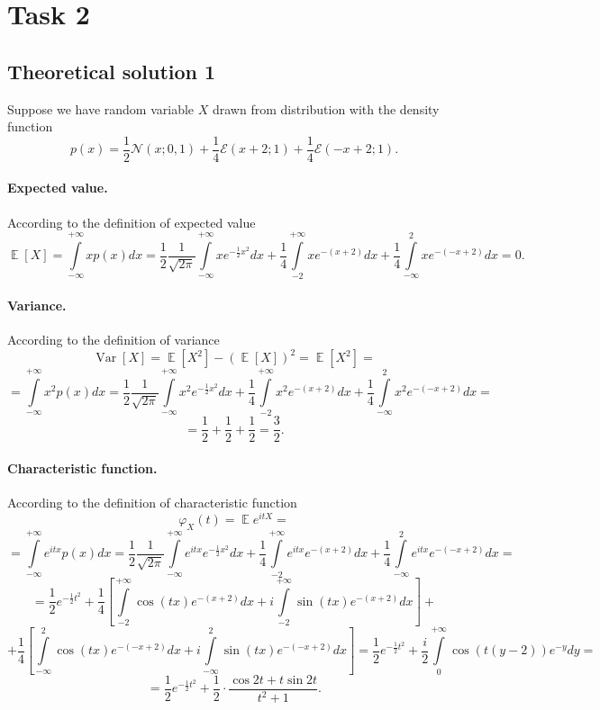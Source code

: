 \documentclass[a4paper, 12pt]{article}
\DeclareMathOperator*{\E}{\mathbb{E}}
\DeclareMathOperator*{\Var}{\text{Var}}
\begin{document}
\section{Task 2}
\subsection{Theoretical solution 1}
Suppose we have random variable $X$ drawn from distribution with the density function 
\begin{equation}
\label{eq2_1}
p(x) = \dfrac{1}{2} \mathcal{N}(x; 0, 1) + \dfrac{1}{4} \mathcal{E}(x+2; 1) + \dfrac{1}{4} \mathcal{E}(-x+2; 1).
\end{equation}
\paragraph{Expected value.} According to the definition of expected value
$$
\E [X] = \int \limits_{- \infty}^{+\infty} x p(x) dx = \dfrac{1}{2} \dfrac{1}{\sqrt{2 \pi}} \int \limits_{-\infty}^{+\infty} xe^{-\frac{1}{2}x^2} dx + \dfrac{1}{4} \int \limits_{-2}^{+\infty} xe^{-(x+2)} dx + \dfrac{1}{4} \int \limits_{-\infty}^{2} xe^{-(-x+2)} dx = 0.
$$
\paragraph{Variance.} According to the definition of variance
$$
\Var [X] = \E [X^2] - (\E [X])^2 = \E[X^2] = 
$$
$$
= \int \limits_{- \infty}^{+\infty} x^2 p(x) dx = \dfrac{1}{2} \dfrac{1}{\sqrt{2 \pi}} \int \limits_{-\infty}^{+\infty} x^2e^{-\frac{1}{2}x^2} dx + \dfrac{1}{4} \int \limits_{-2}^{+\infty} x^2e^{-(x+2)} dx + \dfrac{1}{4} \int \limits_{-\infty}^{2} x^2e^{-(-x+2)} dx =
$$
$$
= \dfrac{1}{2} + \dfrac{1}{2} + \dfrac{1}{2} = \dfrac{3}{2}.
$$
\paragraph{Characteristic function.}
According to the definition of characteristic function
$$
\varphi_X(t) = \E e^{itX} = 
$$
$$
= \int \limits_{- \infty}^{+\infty} e^{itx} p(x) dx = \dfrac{1}{2} \dfrac{1}{\sqrt{2 \pi}} \int \limits_{-\infty}^{+\infty} e^{itx} e^{-\frac{1}{2}x^2} dx + \dfrac{1}{4} \int \limits_{-2}^{+\infty} e^{itx} e^{-(x+2)} dx + \dfrac{1}{4} \int \limits_{-\infty}^{2} e^{itx} e^{-(-x+2)} dx = 
$$
$$
= \dfrac{1}{2} e^{-\frac{1}{2}t^2} + \dfrac{1}{4} \left[ \int \limits_{-2}^{+\infty} \cos(tx) e^{-(x + 2)}dx + i\int \limits_{-2}^{+\infty} \sin(tx) e^{-(x + 2)}dx \right] +
$$
$$
+ \dfrac{1}{4} \left[ \int \limits_{-\infty}^{2} \cos(tx) e^{-(-x+2)}dx + i\int \limits_{-\infty}^{2} \sin(tx) e^{-(-x+2)}dx \right] = 
\dfrac{1}{2} e^{-\frac{1}{2}t^2} + \dfrac{i}{2} \int \limits_{0}^{+\infty} \cos(t(y-2)) e^{-y}dy =
$$
$$
= \dfrac{1}{2} e^{-\frac{1}{2}t^2} + \dfrac{1}{2}  \cdot \dfrac{\cos2t + t \sin2t}{t^2 + 1}.
$$
\end{document}
